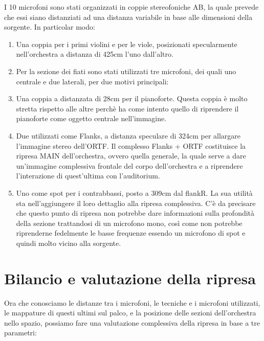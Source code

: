 I 10 microfoni sono stati organizzati in coppie stereofoniche AB, la quale prevede che essi siano distanziati ad una distanza variabile in base alle dimensioni della sorgente. In particolar modo:

\begin{enumerate}
\item Una coppia per i primi violini e per le viole, posizionati specularmente nell'orchestra a distanza di 425cm l'uno dall'altro.

\item Per la sezione dei fiati sono stati utilizzati tre microfoni, dei quali uno centrale e due laterali, per due motivi principali:

\item Una coppia a distanzata di 28cm per il pianoforte. Questa coppia è molto stretta rispetto alle altre perchè ha come intento quello di riprendere il pianoforte come oggetto centrale nell'immagine.

\item Due utilizzati come Flanks, a distanza speculare di 324cm per allargare l'immagine stereo dell'ORTF. Il complesso Flanks + ORTF costituisce la ripresa MAIN dell'orchestra, ovvero quella generale, la quale serve a dare un'immagine complessiva frontale del corpo dell'orchestra e a riprendere l'interazione di quest'ultima con l'auditorium.

\item Uno come spot per i contrabbassi, posto a 309cm dal flankR. La sua utilità sta nell'aggiungere il loro dettaglio alla ripresa complessiva. C'è da precisare che questo punto di ripresa non potrebbe dare informazioni sulla profondità della sezione trattandosi di un microfono mono, così come non potrebbe riprenderne fedelmente le basse frequenze essendo un microfono di spot e quindi molto vicino alla sorgente.
\end{enumerate}

\section*{Bilancio e valutazione della ripresa}
Ora che conosciamo le distanze tra i microfoni, le tecniche e i microfoni utilizzati, le mappature di questi ultimi sul palco, e la posizione delle sezioni dell'orchestra nello spazio, possiamo fare una valutazione complessiva della ripresa in base a tre parametri:

